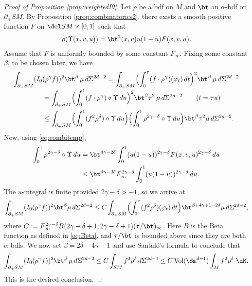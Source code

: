 \begin{proof}[Proof of Proposition \ref{prop:weightedI0}] Let $\rho$ be a bdf on $M$ and $\bt$ an $\alpha$-bdf on $\partial_+ SM$. By Proposition \ref{prop:combinatorics2}, there exists a smooth positive function $F$ on $\del SM\times [0,1]$ such that\vspace*{-3pt}
\begin{equation}
\rho (\Upsilon(x,v,u)) = \bt^2 (x,v) u(1-u) F(x,v,u).
\label{eq:combitemp}
\end{equation}
Assume that $F$ is uniformly bounded by some constant $F_\infty$. Fixing some constant $\beta$, to be chosen later, we have\vspace*{-5pt}
\begin{align*}
\int_{\partial_+ SM} (I_0 &(\rho^\gamma f))^2 \bt^\beta \, \mu \, d\Sigma^{2d-2} = \int_{\partial_+ SM} \Bigl(\int_0^\tau (f\cdot \rho^\gamma) (\varphi_t)\,dt \Bigr)^2 \bt^{\beta} \, \mu\,d\Sigma^{2d-2} \\[-3pt]
&= \int_{\partial_+ SM} \Bigl(\int_0^1 (f\cdot \rho^\gamma)\circ \Upsilon\,du \Bigr)^2 \bt^{\beta} \tau^2 \, \mu\,d\Sigma^{2d-2} \qquad (t=\tau u)\\
&\le \int_{\partial_+ SM} \Bigl(\int_0^1 (f^2 \rho^\delta)\circ \Upsilon\,du\Bigr) \Bigl(\int_0^1 \rho^{2\gamma-\delta}\circ \Upsilon\,du \Bigr) \bt^{\beta} \tau^2 \mu\,d\Sigma^{2d-2}.
\end{align*}
Now, using \eqref{eq:combitemp},
\begin{align*}
\int_0^1 \rho^{2\gamma-\delta}\circ \Upsilon\,du &= \bt^{4\gamma-2\delta} \int_0^1 (u(1-u))^{2\gamma-\delta} F(x,v,u)^{2\gamma-\delta}\,du \\
&\le \bt^{4\gamma-2\delta} F_{\infty}^{2\gamma-\delta} \int_0^1 (u(1-u))^{2\gamma-\delta}\,du.
\end{align*}
The $u$-integral is finite provided $2\gamma-\delta >-1$, so we arrive at
\begin{equation*}
\int_{\partial_+ SM} (I_0 (\rho^\gamma f))^2 \bt^\beta \mu\,d\Sigma^{2d-2} \le C \int_{\partial_+ SM} \Bigl(\int_0^\tau (f^2 \rho^\delta) (\varphi_t)\,dt\Bigr) \bt^{\beta+4\gamma+1-2\delta} \mu\,d\Sigma^{2d-2},
\end{equation*}
where $C := F_\infty^{2\gamma-\delta} B(2\gamma-\delta+1, 2\gamma-\delta+1) (\tau/\bt)_\infty$. Here $B$ is the Beta function as defined in \eqref{eq:Beta}, and $\tau/\bt$ is bounded above since they are both $\alpha$-bdfs. We now set $\beta = 2\delta-4\gamma-1$ and use Santaló's formula to conclude that
\begin{equation*}
\int_{\partial_+ SM} (I_0 (\rho^\gamma f))^2 \bt^\beta \, \mu \, d\Sigma^{2d-2} \le C \int_{SM} f^2 \rho^{\delta}\,d\Sigma^{2d-1} \le
C\, \mathrm{Vol}(\Sm^{d-1}) \int_M f^2 \rho^\delta\ \dM.
\end{equation*}
This is the desired conclusion.
\end{proof}

